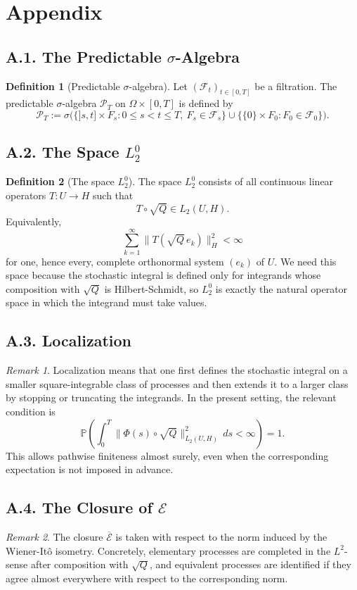 \documentclass[11pt]{article}
\theoremstyle{definition}
\newtheorem{definition}{Definition}
\theoremstyle{remark}
\newtheorem{remark}{Remark}
\begin{document}
\section*{Appendix}
\subsection*{A.1. The Predictable \(\sigma\)-Algebra}
\begin{definition}[Predictable \(\sigma\)-algebra]
Let \((\mathcal F_t)_{t\in[0,T]}\) be a filtration. The predictable \(\sigma\)-algebra \(\mathcal P_T\) on \(\Omega\times[0,T]\) is defined by
\[
\mathcal P_T
:=
\sigma\bigl(\{]s,t]\times F_s:0\le s<t\le T,\ F_s\in\mathcal F_s\}\cup\{\{0\}\times F_0:F_0\in\mathcal F_0\}\bigr).
\]
\end{definition}

\subsection*{A.2. The Space \(L_2^0\)}
\begin{definition}[The space \(L_2^0\)]
The space \(L_2^0\) consists of all continuous linear operators \(T:U\to H\) such that
\[
T\circ \sqrt Q\in L_2(U,H).
\]
Equivalently,
\[
\sum_{k=1}^{\infty}\|T(\sqrt Q\,e_k)\|_H^2<\infty
\]
for one, hence every, complete orthonormal system \((e_k)\) of \(U\).
We need this space because the stochastic integral is defined only for integrands whose composition with \(\sqrt Q\) is Hilbert-Schmidt, so \(L_2^0\) is exactly the natural operator space in which the integrand must take values.
\end{definition}

\subsection*{A.3. Localization}
\begin{remark}
Localization means that one first defines the stochastic integral on a smaller square-integrable class of processes and then extends it to a larger class by stopping or truncating the integrands. In the present setting, the relevant condition is
\[
\mathbb P\left(\int_0^T \|\Phi(s)\circ \sqrt Q\|_{L_2(U,H)}^2\,ds<\infty\right)=1.
\]
This allows pathwise finiteness almost surely, even when the corresponding expectation is not imposed in advance.
\end{remark}

\subsection*{A.4. The Closure of \(\mathcal E\)}
\begin{remark}
The closure \(\overline{\mathcal E}\) is taken with respect to the norm induced by the Wiener-It\^o isometry. Concretely, elementary processes are completed in the \(L^2\)-sense after composition with \(\sqrt Q\), and equivalent processes are identified if they agree almost everywhere with respect to the corresponding norm.
\end{remark}
\end{document}
